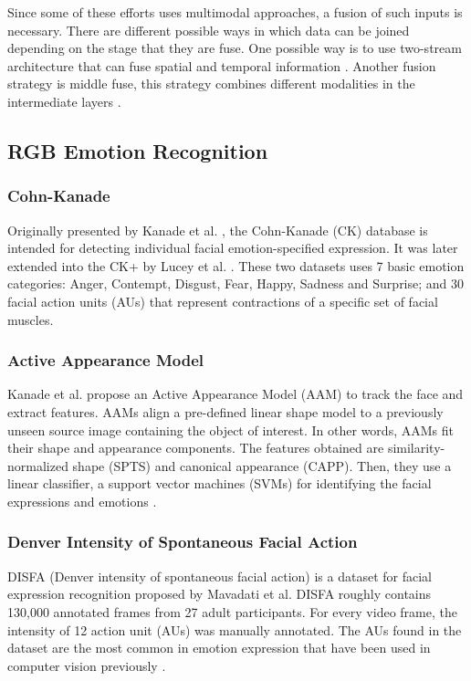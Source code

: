 Since some of these efforts uses multimodal approaches, a fusion of such inputs is necessary. There are different possible ways in which data can be joined depending on the stage that they are fuse. One possible way is to use two-stream architecture that can fuse spatial and temporal information \cite{Feichtenhofer2016ConvolutionalRecognition}. Another fusion strategy is middle fuse, this strategy combines different modalities in the intermediate layers \cite{Neverova2016ModDrop:Recognition}.

\subsection{RGB Emotion Recognition}

\subsubsection{Cohn-Kanade}
Originally presented by Kanade et al. \cite{KanadeComprehensiveAnalysis}, the Cohn-Kanade (CK) database is intended for detecting individual facial emotion-specified expression. It was later extended into the CK+ by Lucey et al. \cite{LuceyTheExpression}. These two datasets uses 7 basic emotion categories: Anger, Contempt, Disgust, Fear, Happy, Sadness and Surprise; and 30 facial action units (AUs) that represent contractions of a specific set of
facial muscles.



\subsubsection{Active Appearance Model}
Kanade et al. propose an Active Appearance Model (AAM) to track the face and extract features. AAMs align a pre-defined linear shape model to a previously unseen source image containing the object of interest. In other words, AAMs fit their shape and appearance components. The features obtained are similarity-normalized shape (SPTS) and canonical appearance (CAPP). Then, they use a linear classifier, a support vector machines (SVMs) for identifying the facial expressions and emotions \cite{KanadeComprehensiveAnalysis}.



\subsubsection{Denver Intensity of Spontaneous Facial Action}
DISFA (Denver intensity of spontaneous facial action) is a dataset for facial expression recognition proposed by Mavadati et al. DISFA roughly contains 130,000 annotated frames from 27 adult participants. For every video frame, the intensity of 12 action unit (AUs) was manually annotated. The AUs found in the dataset are the most common in emotion expression that have been used in computer vision previously \cite{Mavadati2013DISFA:Database}.

